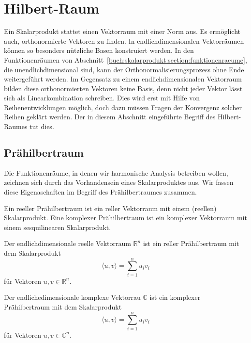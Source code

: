 %
%
%
\section{Hilbert-Raum
\label{buch:skalarprodukt:section:hilbertraum}}
Ein Skalarprodukt stattet einen Vektorraum mit einer Norm aus.
Es ermöglicht auch, orthonormierte Vektoren zu finden.
In endlichdimensionalen Vektorräumen können so besonders nützliche
Basen konstruiert werden.
In den Funktionenräumen von
Abschnitt~\ref{buch:skalarprodukt:section:funktionenraeume},
die unendlichdimensional sind, kann der Orthonormalisierungsprozess
ohne Ende weitergeführt werden.
Im Gegensatz zu einem endlichdimensionalen Vektorraum bilden diese
orthonormierten Vektoren keine Basis, denn nicht jeder Vektor lässt
sich als Linearkombination schreiben.
Dies wird erst mit Hilfe von Reihenentwicklungen möglich, doch dazu
müssen Fragen der Konvergenz solcher Reihen geklärt werden.
Der in diesem Abschnitt eingeführte Begriff des Hilbert-Raumes tut dies.

%
%
\subsection{Prähilbertraum}
Die Funktionenräume, in denen wir harmonische Analysis betreiben wollen,
zeichnen sich durch das Vorhandensein eines Skalarproduktes aus.
Wir fassen diese Eigenaschaften im Begriff des Prähilbertraumes
zusammen.

\begin{definition}
Ein reeller Prähilbertraum ist ein reller Vektorraum mit einem
(reellen) Skalarprodukt.
%
Eine komplexer Prähilbertraum ist ein komplexer Vektorraum mit einem
sesquilinearen Skalarprodukt.
\end{definition}

\begin{beispiel}
Der endlichdimensionale reelle Vektorraum $\mathbb{R}^n$ ist ein
reller Prähilbertraum mit dem Skalarprodukt
\[
\langle u,v\rangle
=
\sum_{i=1}^n u_iv_i
\]
für Vektoren $u,v\in\mathbb{R}^n$.
\end{beispiel}

\begin{beispiel}
Der endlichedimensionale komplexe Vektorrau $\mathbb{C}$ ist ein
komplexer Prähilbertraum mit dem Skalarprodukt
\[
\langle u,v\rangle
=
\sum_{i=1}^n \overline{u}_iv_i
\]
für Vektoren $u,v\in\mathbb{C}^n$.
\end{beispiel}

